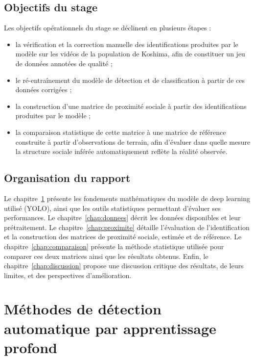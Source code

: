 \documentclass[11pt,a4paper]{report}
\begin{document}
\section*{Objectifs du stage}

Les objectifs opérationnels du stage se déclinent en plusieurs étapes :
\begin{itemize}
    \item la vérification et la correction manuelle des identifications
    produites par le modèle sur les vidéos de la population de Koshima,
    afin de constituer un jeu de données annotées de qualité ;
    \item le ré-entraînement du modèle de détection et de classification à
    partir de ces données corrigées ;
    \item la construction d'une matrice de proximité sociale à partir des
    identifications produites par le modèle ;
    \item la comparaison statistique de cette matrice à une matrice de
    référence construite à partir d'observations de terrain, afin
    d'évaluer dans quelle mesure la structure sociale inférée
    automatiquement reflète la réalité observée.
\end{itemize}

\section*{Organisation du rapport}

Le chapitre~\ref{chap:methode} présente les fondements mathématiques du
modèle de deep learning utilisé (YOLO), ainsi que les outils statistiques
permettant d'évaluer ses performances. Le chapitre~\ref{chap:donnees}
décrit les données disponibles et leur prétraitement. Le
chapitre~\ref{chap:proximite} détaille l'évaluation de l'identification et
la construction des matrices de proximité sociale, estimée et de
référence. Le chapitre~\ref{chap:comparaison} présente la méthode
statistique utilisée pour comparer ces deux matrices ainsi que les
résultats obtenus. Enfin, le chapitre~\ref{chap:discussion} propose une
discussion critique des résultats, de leurs limites, et des perspectives
d'amélioration.


\chapter{Méthodes de détection automatique par apprentissage profond}
\label{chap:methode}
\end{document}
